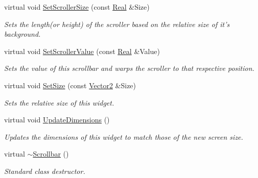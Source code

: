 \begin{DoxyCompactItemize}
virtual void \hyperlink{classMezzanine_1_1UI_1_1Scrollbar_ab0eb07194c16e262a5a842077eb27e3b}{SetScrollerSize} (const \hyperlink{namespaceMezzanine_a726731b1a7df72bf3583e4a97282c6f6}{Real} \&Size)
\begin{DoxyCompactList}\small\item\em Sets the length(or height) of the scroller based on the relative size of it's background. \item\end{DoxyCompactList}\item 
virtual void \hyperlink{classMezzanine_1_1UI_1_1Scrollbar_a08cd47814e026b1eb20d25c1a3ec5e54}{SetScrollerValue} (const \hyperlink{namespaceMezzanine_a726731b1a7df72bf3583e4a97282c6f6}{Real} \&Value)
\begin{DoxyCompactList}\small\item\em Sets the value of this scrollbar and warps the scroller to that respective position. \item\end{DoxyCompactList}\item 
virtual void \hyperlink{classMezzanine_1_1UI_1_1Scrollbar_a159e7f6c1493a30ec00da9001a04f8e9}{SetSize} (const \hyperlink{classMezzanine_1_1Vector2}{Vector2} \&Size)
\begin{DoxyCompactList}\small\item\em Sets the relative size of this widget. \item\end{DoxyCompactList}\item 
virtual void \hyperlink{classMezzanine_1_1UI_1_1Scrollbar_ad9e54e999910371173280b827f80f504}{UpdateDimensions} ()
\begin{DoxyCompactList}\small\item\em Updates the dimensions of this widget to match those of the new screen size. \item\end{DoxyCompactList}\item 
\hypertarget{classMezzanine_1_1UI_1_1Scrollbar_a37a3624127018fcfbcac521a84de926f}{
virtual \hyperlink{classMezzanine_1_1UI_1_1Scrollbar_a37a3624127018fcfbcac521a84de926f}{$\sim$Scrollbar} ()}
\label{classMezzanine_1_1UI_1_1Scrollbar_a37a3624127018fcfbcac521a84de926f}

\begin{DoxyCompactList}\small\item\em Standard class destructor. \item\end{DoxyCompactList}\end{DoxyCompactItemize}
